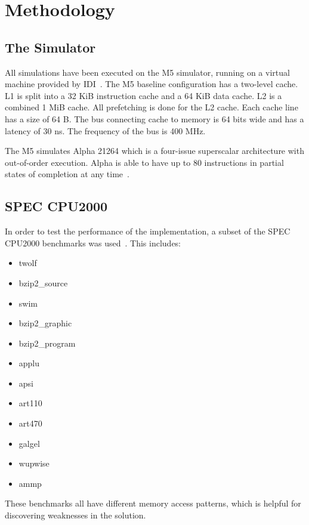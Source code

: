 \section{Methodology} %


\subsection{The Simulator}

All simulations have been executed on the M5 simulator, running on a
virtual machine provided by IDI~\cite{idi}.  The M5 baseline
configuration has a two-level cache. L1 is split into a 32 KiB
instruction cache and a 64 KiB data cache. L2 is a combined 1 MiB
cache. All prefetching is done for the L2 cache. Each cache line has a
size of 64 B. The bus connecting cache to memory is 64 bits wide and
has a latency of 30 ns. The frequency of the bus is 400 MHz.

The M5 simulates Alpha 21264 which is a four-issue superscalar
architecture with out-of-order execution. Alpha is able to have up to
80 instructions in partial states of completion at any
time~\cite{kessler_1999}.

\subsection{SPEC CPU2000}

In order to test the performance of the implementation, a subset of the SPEC
CPU2000 benchmarks was used~\cite{spec2000}. This includes:
\begin{multicols}{2}
\begin{itemize}
\item twolf
\item bzip2\_source
\item swim
\item bzip2\_graphic
\item bzip2\_program
\item applu
\item apsi
\item art110
\item art470
\item galgel
\item wupwise
\item ammp
\end{itemize}
\end{multicols}

These benchmarks all have different memory access patterns, which is
helpful for discovering weaknesses in the solution.
